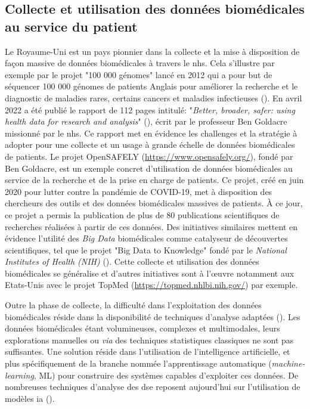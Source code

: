 \subsection{Collecte et utilisation des données biomédicales au service du patient}
Le Royaume-Uni est un pays pionnier dans la collecte et la mise à disposition de façon massive de données biomédicales à travers le \gls{nhs}. Cela s'illustre par exemple par le projet "100 000 génomes" lancé en 2012 qui a pour but de séquencer 100 000 génomes de patients Anglais pour améliorer la recherche et le diagnostic de maladies rares, certains cancers et maladies infectieuses (\cite{nunn_public_2019}). En avril 2022 a été publié le rapport de 112 pages intitulé: "\textit{Better, broader, safer: using health data for research and analysis}" (\cite{ben_goldacre_better_2022}), écrit par le professeur Ben Goldacre missionné par le \gls{nhs}. Ce rapport met en évidence les challenges et la stratégie à adopter pour une collecte et un usage à grande échelle de données biomédicales de patients. Le projet OpenSAFELY (\href{https://www.opensafely.org/}{https://www.opensafely.org/}), fondé par Ben Goldacre, est un exemple concret d'utilisation de données biomédicales au service de la recherche et de la prise en charge de patients. Ce projet, créé en juin 2020 pour lutter contre la pandémie de COVID-19, met à disposition des chercheurs des outils et des données biomédicales massives de patients. À ce jour, ce projet a permis la publication de plus de 80 publications scientifiques de recherches réalisées à partir de ces données. Des initiatives similaires  mettent en évidence l'utilité des \textit{Big Data} biomédicales comme catalyseur de découvertes scientifiques, tel que le projet "Big Data to Knowledge" fondé par le \textit{National Institutes of Health (NIH)} (\cite{toga_big_2015}). Cette collecte et utilisation des données biomédicales se généralise et d'autres initiatives sont à l'œuvre notamment aux Etats-Unis avec le projet TopMed (\url{https://topmed.nhlbi.nih.gov/}) par exemple.

Outre la phase de collecte, la difficulté dans l'exploitation des données biomédicales réside dans la disponibilité de techniques d'analyse adaptées (\cite{wang_big_2019, ismail_requirements_2020}). Les données biomédicales étant volumineuses, complexes et multimodales, leurs explorations manuelles ou \textit{via} des techniques statistiques classiques ne sont pas suffisantes. Une solution réside dans l'utilisation de l'intelligence artificielle, et plus spécifiquement de la branche nommée l'apprentissage automatique (\textit{machine-learning}, ML) pour construire des systèmes capables d'exploiter ces données. De nombreuses techniques d'analyse des \gls{dse} reposent aujourd'hui sur l'utilisation de modèles \gls{ia} (\cite{yang_large_2022, de_mello_semantic_2022, li_electronic_2022}).

